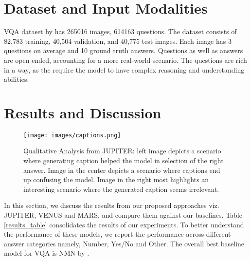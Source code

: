 \section{Dataset and Input Modalities}
VQA dataset by \cite{AntolALMBZP15} has 265016 images, 614163
questions.  The dataset consists of  82,783 training, 40,504 validation, and 40,775 test images. Each image has 3 questions on average and 10 ground truth answers. Questions as well as answers are open ended, accounting for a more real-world scenario. The questions are rich in a way, as the require the model to have complex reasoning and understanding abilities.


\section{Results and Discussion}

\iffalse
 When presenting your results, try to follow the same sequence as you specified in the introduction of the Experimental Setup. If you stated 3 research questions, then it would be best to have 3 sub-sections in the Results and Discussion, one for each research question. Present in tables and/or figures your experimental results. It is not enough just to list the results you need to discuss them – what do they mean, what implications they have, how
should they be interpreted in the broader context. If you want to make your results more convincing, where possible, include statistical tests to demonstrate the statistical significance of your findings. You should also include a discussion (if possible, with examples and figures) of the failure cases of the baseline models.
\fi



\begin{figure} [h]
    \centering
    \texttt{[image: images/captions.png]}
    \caption{Qualitative Analysis from JUPITER: left image depicts a scenario where generating caption helped the model in selection of the right answer. Image in the center depicts a scenario where captions end up confusing the model. Image in the right most highlights an interesting scenario where the generated caption seems irrelevant.}
    \label{fig:jupiter_qualitative}
\end{figure}
In this section, we discuss the results from our proposed approaches viz. JUPITER, VENUS and MARS, and compare them against our baselines. Table \ref{results_table} consolidates the results of our experiments. To better understand the performance of these models, we report the performance across different answer categories namely, Number, Yes/No and Other. The overall best baseline model for VQA is NMN by \cite{HuARDS17}.

